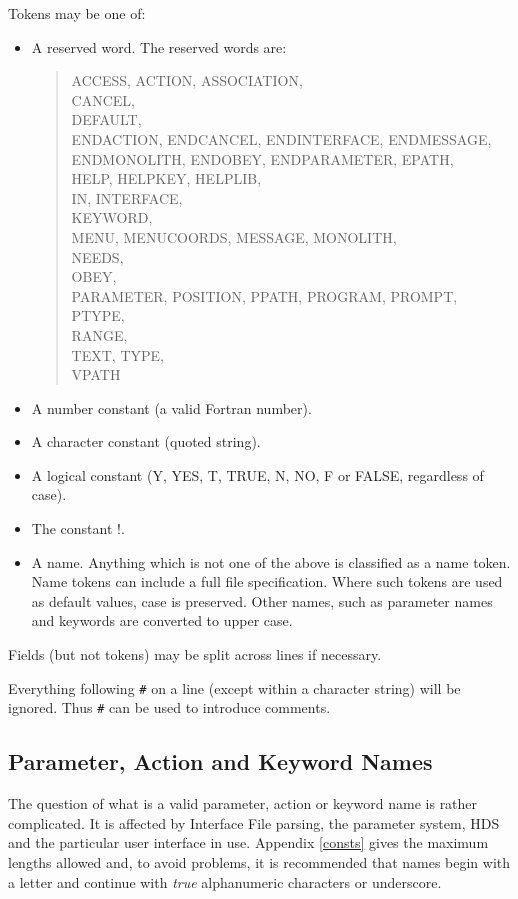 \documentclass[twoside,11pt]{article}
\newcommand{\xlabel}[1]{}
\renewcommand{\_}{\texttt{\symbol{95}}}
\begin{document}
Tokens may be one of:
\begin{itemize}
\item A reserved word. The reserved words are:
\begin{quote}
ACCESS,
ACTION,
ASSOCIATION,\\
CANCEL,\\
DEFAULT,\\
ENDACTION,
ENDCANCEL,
ENDINTERFACE,
ENDMESSAGE,\\
ENDMONOLITH,
ENDOBEY,
ENDPARAMETER,
EPATH,\\
HELP,
HELPKEY,
HELPLIB,\\
IN,
INTERFACE,\\
KEYWORD,\\
MENU,
MENUCOORDS,
MESSAGE,
MONOLITH,\\
NEEDS,\\
OBEY,\\
PARAMETER,
POSITION,
PPATH,
PROGRAM,
PROMPT,
PTYPE,\\
RANGE,\\
TEXT,
TYPE,\\
VPATH
\end{quote}
\item A number constant (a valid Fortran number).
\item A character constant (quoted string).
\item A logical constant (Y, YES, T, TRUE, N, NO, F or FALSE, regardless of
case).
\item The constant !.
\item A name. Anything which is not one of the above is classified as a name
token.
Name tokens can include a full file specification. Where such tokens are
used as default values, case is preserved. Other names, such as parameter names
and keywords are converted to upper case.
\end{itemize}
Fields (but not tokens) may be split across lines if necessary.

Everything following \texttt{\#} on a line (except within a character
string) will be ignored.
Thus  \texttt{\#} can be used to introduce comments.

\subsection{Parameter, Action and Keyword Names
\xlabel{parameter_action_and_keyword_names}\label{names}}

The question of what is a valid parameter, action or keyword name is rather
complicated.
It is affected by Interface File parsing, the parameter system, HDS and the
particular user interface in use.
Appendix \ref{consts} gives the maximum lengths allowed and, to avoid problems,
it is recommended that names begin with a letter and continue with {\em true}
alphanumeric characters or underscore.
\end{document}
